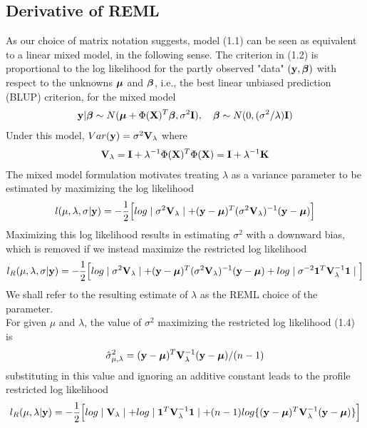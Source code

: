 \documentclass[11pt]{article}
\begin{document}
\subsection{\textbf{Derivative of REML}}
As our choice of matrix notation suggests, model (1.1) can be seen as equivalent to a linear mixed model, in the following sense. The criterion in (1.2) is proportional to the log likelihood for the partly observed "data" $({\bf y}, \boldsymbol{\beta})$ with respect to the unknowns $\boldsymbol{\mu}$ and $\boldsymbol{\beta}$, i.e., the best linear unbiased prediction (BLUP) criterion, for the mixed model
\begin{align*}
{\bf y}|\boldsymbol{\beta} \sim N(\boldsymbol{\mu}+\Phi({\bf X})^T \boldsymbol{\beta}, \sigma^2{\bf I}), \quad \boldsymbol{\beta} \sim N(0, (\sigma^2/\lambda) {\bf I})
\end{align*}
Under this model, $Var({\bf y})=\sigma^2 {\bf V}_\lambda$ where
\begin{align}
{\bf V}_\lambda={\bf I}+\lambda^{-1}\Phi({\bf X})^T\Phi({\bf X})={\bf I}+\lambda^{-1}{\bf K}
\end{align}
The mixed model formulation motivates treating $\lambda$ as a variance parameter to be estimated by maximizing the log likelihood
\begin{align*}
l(\mu, \lambda, \sigma|{\bf y})=-\frac{1}{2}\Big[log\mid \sigma^2 {\bf V}_\lambda \mid +({\bf y}-\boldsymbol{\mu})^T(\sigma^2 {\bf V}_\lambda)^{-1}({\bf y}-\boldsymbol{\mu}) \Big]
\end{align*}
Maximizing this log likelihood results in estimating $\sigma^2$ with a downward bias, which is removed if we instead maximize the restricted log likelihood
\begin{align}
l_R(\mu, \lambda, \sigma|{\bf y})=-\frac{1}{2}\Big[log\mid \sigma^2 {\bf V}_\lambda \mid +({\bf y}-\boldsymbol{\mu})^T(\sigma^2 {\bf V}_\lambda)^{-1}({\bf y}-\boldsymbol{\mu})+log \mid \sigma^{-2}\mathbf{1}^T{\bf V}_\lambda^{-1}\mathbf{1} \mid \Big]
\end{align}
We shall refer to the resulting estimate of $\lambda$ as the REML choice of the parameter.\\
For given $\mu$ and $\lambda$, the value of $\sigma^2$ maximizing the restricted log likelihood (1.4) is
\begin{align}
\hat{\sigma}_{\mu, \lambda}^2=({\bf y}-\boldsymbol{\mu})^T{\bf V}_\lambda^{-1}({\bf y}-\boldsymbol{\mu})/(n-1)
\end{align}
substituting in this value and ignoring an additive constant leads to the profile restricted log likelihood
\begin{align}
l_R(\mu, \lambda|{\bf y})=-\frac{1}{2}\Big[log\mid {\bf V}_\lambda \mid +log \mid \mathbf{1}^T{\bf V}_\lambda^{-1}\mathbf{1} \mid+(n-1)log\{({\bf y}-\boldsymbol{\mu})^T {\bf V}_\lambda^{-1}({\bf y}-\boldsymbol{\mu})\}\Big]
\end{align}
\end{document}
